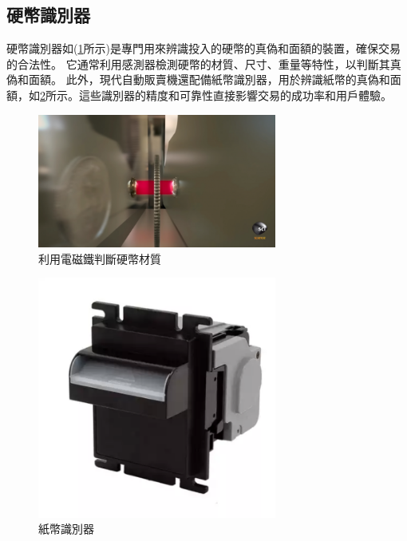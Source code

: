 \documentclass[12pt]{article}       %
\begin{document}
\subsection{硬幣識別器} 
\hspace{2em}
硬幣識別器如(\ref{fig:example7}所示)是專門用來辨識投入的硬幣的真偽和面額的裝置，確保交易的合法性。
它通常利用感測器檢測硬幣的材質、尺寸、重量等特性，以判斷其真偽和面額。
此外，現代自動販賣機還配備紙幣識別器，用於辨識紙幣的真偽和面額，如\ref{fig:example8}所示。這些識別器的精度和可靠性直接影響交易的成功率和用戶體驗。
\begin{figure}[H]
    \centering
    \includegraphics[width=0.7\textwidth]{20181217-113012_U13613_M484168_967b.png}     %
    \caption{利用電磁鐵判斷硬幣材質\cite{storm_vending_machine_2019}}    %
    \label{fig:example7}    %
\end{figure} 

\begin{figure}[H]
    \centering
    \includegraphics[width=0.7\textwidth]{1234.png}     %
    \caption{紙幣識別器\cite{taobao_product_2025}}    %
    \label{fig:example8}    %
\end{figure} 
\end{document}
